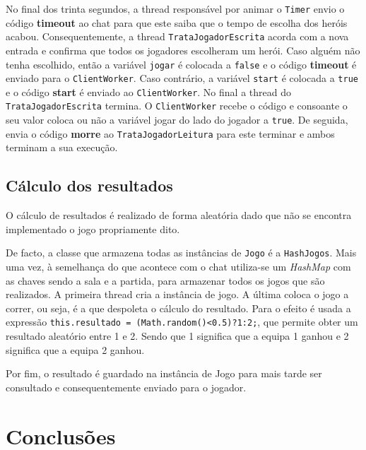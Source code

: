 \documentclass[a4paper]{article}
\begin{document}
No final dos trinta segundos, a thread responsável por animar o \texttt{Timer} envio o código \textbf{timeout} ao chat para que este saiba que o tempo de escolha dos heróis acabou. Consequentemente, a thread \texttt{TrataJogadorEscrita} acorda com a nova entrada e confirma que todos os jogadores escolheram um herói. Caso alguém não tenha escolhido, então a variável \texttt{jogar} é colocada a \texttt{false} e o código \textbf{timeout} é enviado para o \texttt{ClientWorker}. Caso contrário, a variável \texttt{start} é colocada a \texttt{true} e o código \textbf{start} é enviado ao \texttt{ClientWorker}. No final a thread do \texttt{TrataJogadorEscrita} termina. O \texttt{ClientWorker} recebe o código e consoante o seu valor coloca ou não a variável jogar do lado do jogador a \texttt{true}. De seguida, envia o código \textbf{morre} ao \texttt{TrataJogadorLeitura} para este terminar e ambos terminam a sua execução.


\subsection{Cálculo dos resultados}
\label{sec:3.5}
\hspace{3mm} O cálculo de resultados é realizado de forma aleatória dado que não se encontra implementado o jogo propriamente dito.

De facto, a classe que armazena todas as instâncias de \texttt{Jogo} é a \texttt{HashJogos}. Mais uma vez, à semelhança do que acontece com o chat utiliza-se um \textit{HashMap} com as chaves sendo a sala e a partida, para armazenar todos os jogos que são realizados. A primeira thread cria a instância de jogo. A última coloca o jogo a correr, ou seja, é a que despoleta o cálculo do resultado. Para o efeito é usada a expressão \texttt{this.resultado = (Math.random()<0.5)?1:2;}, que permite obter um resultado aleatório entre 1 e 2. Sendo que 1 significa que a equipa 1 ganhou e 2 significa que a equipa 2 ganhou. 

Por fim, o resultado é guardado na instância de Jogo para mais tarde ser consultado e consequentemente enviado para o jogador.


\section{Conclusões}
\label{sec:4}
\end{document}
